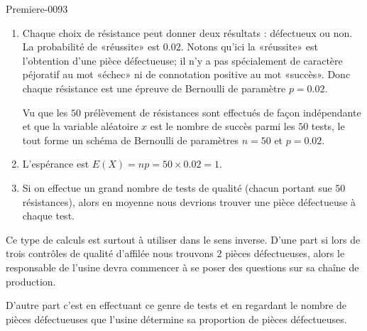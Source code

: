 
\begin{corrige}{Premiere-0093}

    \begin{enumerate}
        \item
            Chaque choix de résistance peut donner deux résultats : défectueux ou non. La probabilité de «réussite» est \( 0.02\). Notons qu'ici la «réussite» est l'obtention d'une pièce défectueuse; il n'y a pas spécialement de caractère péjoratif au mot «échec» ni de connotation positive au mot «succès». Donc chaque résistance est une épreuve de Bernoulli de paramètre \( p=0.02\).

            Vu que les \( 50\) prélèvement de résistances sont effectués de façon indépendante et que la variable aléatoire \( x\) est le nombre de succès parmi les \( 50\) tests, le tout forme un schéma de Bernoulli de paramètres \( n=50\) et \( p=0.02\).
        \item
            L'espérance est \( E(X)=np=50\times 0.02=1\).
        \item
            Si on effectue un grand nombre de tests de qualité (chacun portant sue \( 50\) résistances), alors en moyenne nous devrions trouver une pièce défectueuse à chaque test.
    \end{enumerate}
    Ce type de calculs est surtout à utiliser dans le sens inverse. D'une part si lors de trois contrôles de qualité d'affilée nous trouvons \( 2\) pièces défectueuses, alors le responsable de l'usine devra commencer à se poser des questions sur sa chaîne de production.
    
    D'autre part c'est en effectuant ce genre de tests et en regardant le nombre de pièces défectueuses que l'usine détermine sa proportion de pièces défectueuses.

\end{corrige}

